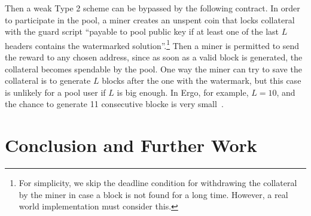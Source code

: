 \documentclass[11pt]{article}
\begin{document}
Then a weak Type 2 scheme can be bypassed by the following contract. In order to participate in the pool, a miner creates an unspent coin that locks collateral with the guard script ``payable to pool public key if at least one of the last $L$ headers contains the watermarked solution''.\footnote{For simplicity, we skip the deadline condition for withdrawing the collateral by the miner in case a block is not found for a long time. However, a real world implementation must consider this.}
Then a miner is permitted to send the reward to any chosen address, since as soon as a valid block is generated, the collateral becomes spendable by the pool. One way the miner can try to save the collateral is to generate $L$ blocks after the one with the watermark, but this case is unlikely for a pool user if $L$ is big enough. In Ergo, for example, $L = 10$, and the chance to generate 11 consecutive blocke is very small~\cite{Nak08}. 




\section{Conclusion and Further Work}
\end{document}
